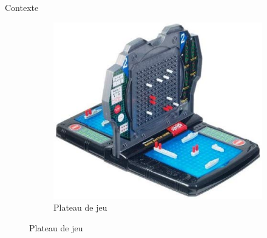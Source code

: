 \begin{frame}{Contexte}
\begin{figure}
\begin{subfigure}{.56\textwidth}
                \includegraphics[width=.9\linewidth]{images/plateau.jpg}
                 \caption*{Plateau de jeu}
                \label{fig:plateaujeu}
            \end{subfigure}
        \end{figure}
	\end{frame}
	
